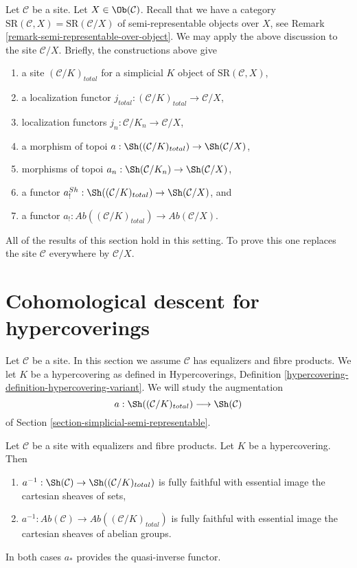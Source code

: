 \begin{remark}
\label{remark-augmentation-over-object}
Let $\mathcal{C}$ be a site. Let $X \in \Ob(\mathcal{C})$.
Recall that we have a category
$\text{SR}(\mathcal{C}, X) = \text{SR}(\mathcal{C}/X)$
of semi-representable objects over $X$,
see Remark \ref{remark-semi-representable-over-object}.
We may apply the above discussion to the site
$\mathcal{C}/X$. Briefly, the constructions above give
\begin{enumerate}
\item a site $(\mathcal{C}/K)_{total}$ for a simplicial $K$ object
of $\text{SR}(\mathcal{C}, X)$,
\item a localization functor
$j_{total} : (\mathcal{C}/K)_{total} \to \mathcal{C}/X$,
\item localization functors $j_n : \mathcal{C}/K_n \to \mathcal{C}/X$,
\item a morphism of topoi
$a : \Sh((\mathcal{C}/K)_{total}) \to \Sh(\mathcal{C}/X)$,
\item morphisms of topoi
$a_n : \Sh(\mathcal{C}/K_n) \to \Sh(\mathcal{C}/X)$,
\item a functor
$a^{Sh}_! : \Sh((\mathcal{C}/K)_{total}) \to \Sh(\mathcal{C}/X)$, and
\item a functor
$a_! : \textit{Ab}((\mathcal{C}/K)_{total}) \to \textit{Ab}(\mathcal{C}/X)$.
\end{enumerate}
All of the results of this section hold in this setting.
To prove this one replaces
the site $\mathcal{C}$ everywhere by $\mathcal{C}/X$.
\end{remark}







\section{Cohomological descent for hypercoverings}
\label{section-cohomological-descent-hypercoverings}

\noindent
Let $\mathcal{C}$ be a site. In this section we assume $\mathcal{C}$
has equalizers and fibre products. We let $K$ be a hypercovering
as defined in Hypercoverings, Definition
\ref{hypercovering-definition-hypercovering-variant}. We will study
the augmentation
$$
a : \Sh((\mathcal{C}/K)_{total}) \longrightarrow \Sh(\mathcal{C})
$$
of Section \ref{section-simplicial-semi-representable}.

\begin{lemma}
\label{lemma-hypercovering-descent-sheaves}
Let $\mathcal{C}$ be a site with equalizers and fibre products.
Let $K$ be a hypercovering. Then
\begin{enumerate}
\item $a^{-1} : \Sh(\mathcal{C}) \to \Sh((\mathcal{C}/K)_{total})$
is fully faithful with essential image the cartesian sheaves of sets,
\item $a^{-1} : \textit{Ab}(\mathcal{C}) \to
\textit{Ab}((\mathcal{C}/K)_{total})$
is fully faithful with essential image the cartesian sheaves
of abelian groups.
\end{enumerate}
In both cases $a_*$ provides the quasi-inverse functor.
\end{lemma}

